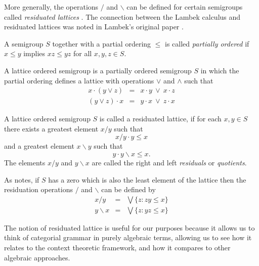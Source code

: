 More generally, the operations $/$ and $\backslash$ can be defined for certain semigroups called \emph{residuated lattices} \citep{Birkhoff:48}. The connection between the Lambek calculus and residuated lattices was noted in Lambek's original paper \citep{Lambek:58}.

\begin{defn}
A semigroup $S$ together with a partial ordering $\le$ is called \emph{partially ordered} if $x \le y$ implies $xz \le yz$ for all $x,y,z \in S$.
\end{defn}

\begin{defn}
A lattice ordered semigroup is a partially ordered semigroup $S$ in which the partial ordering defines a lattice with operations $\lor$ and $\land$ such that
\begin{eqnarray*}
x\cdot (y\lor z) &=& x\cdot y\  \lor\ x\cdot z\\
(y\lor z)\cdot x &=& y\cdot x\ \lor\ z\cdot x
\end{eqnarray*}
\end{defn}

\begin{defn}
A lattice ordered semigroup $S$ is called a residuated lattice, if for each $x,y \in S$ there exists a greatest element $x/y$ such that
$$x/y \cdot y \le x$$
and a greatest element $x\backslash y$ such that
$$y \cdot y\backslash x \le x.$$
The elements $x/y$ and $y\backslash x$ are called the right and left \emph{residuals} or \emph{quotients}.
\end{defn}

As \cite{Birkhoff:48} notes, if $S$ has a zero which is also the least element of the lattice then the residuation operations $/$ and $\backslash$ can be defined by
\begin{eqnarray*}
x/y &=& \bigvee\{z : zy \le x\}\\
y\backslash x &=& \bigvee\{z : yz \le x\}
\end{eqnarray*}

The notion of residuated lattice is useful for our purposes because it allows us to think of categorial grammar in purely algebraic terms, allowing us to see how it relates to the context theoretic framework, and how it compares to other algebraic approaches.


